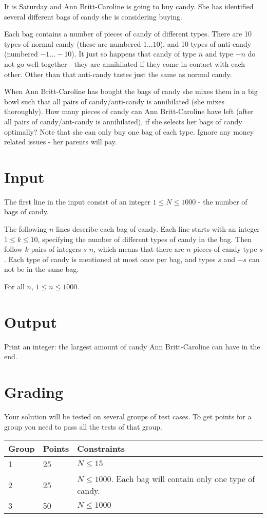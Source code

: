 It is Saturday and Ann Britt-Caroline is going to buy candy. She has identified several different bags of candy she is considering buying.

Each bag contains a number of pieces of candy of different types. There are 10 types of normal candy (these are numbered $1...10$), and 10 types of anti-candy (numbered $-1...-10$). It just so happens that candy of type $n$ and type $-n$ do not go well together - they are annihilated if they come in contact with each other. Other than that anti-candy tastes just the same as normal candy.

When Ann Britt-Caroline has bought the bags of candy she mixes them in a big bowl such that all pairs of candy/anti-candy is annihilated (she mixes thoroughly). How many pieces of candy can Ann Britt-Caroline have left (after all pairs of candy/ant-candy is annihilated), if she selects her bags of candy optimally? Note that she can only buy one bag of each type. Ignore any money related issues - her parents will pay.
\section*{Input}
The first line in the input consist of an integer $1 \le N \le 1000$ - the number of bags of candy.

The following $n$ lines describe each bag of candy.
Each line starts with an integer $1 \le k \le 10$, specifying the number of different types of candy in the bag.
Then follow $k$ pairs of integers $s$ $n$, which means that there are $n$ pieces of candy type $s$.
Each type of candy is mentioned at most once per bag, and types $s$ and $-s$ can not be in the same bag.

For all $n$, $1 \le n \le 1000$.

\section*{Output}
Print an integer: the largest amount of candy Ann Britt-Caroline can have in the end.

\section*{Grading}
Your solution will be tested on several groups of test cases. To get points for a group you need to pass all the tests of that group.

\begin{tabular}{| l | l | l |}
	\hline
	Group & Points & Constraints\\ \hline
  1     & 25         & $N \le 15$ \\ \hline
  2     & 25         & $N \le 1000$. Each bag will contain only one type of candy. \\ \hline
  3     & 50         & $N \le 1000$ \\ \hline
\end{tabular}
